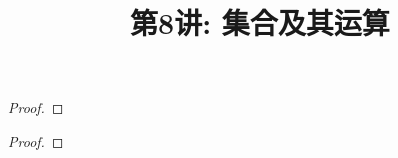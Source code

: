 \documentclass[a4paper, justified]{tufte-handout}
\title{第8讲: 集合及其运算}
\date{\zhtoday} %
\begin{document}
\maketitle
\noplagiarism %
\begin{abstract}
  \begin{center}{}
  \end{center}
\end{abstract}
\beginrequired

\begin{problem}[UD Problem 6.9 (d, e)]
\end{problem}

\begin{solution}
\end{solution}

\begin{problem}[UD Problem 7.1 (d, f)]
\end{problem}

\begin{solution}
\end{solution}

\begin{problem}[UD Problem 7.2]
\end{problem}

\begin{proof}
\end{proof}

\begin{problem}[UD Problem 7.14]
\end{problem}

\begin{solution}
\end{solution}

\begin{problem}[UD Problem 7.19]
\end{problem}

\begin{proof}
\end{proof}
\end{document}
